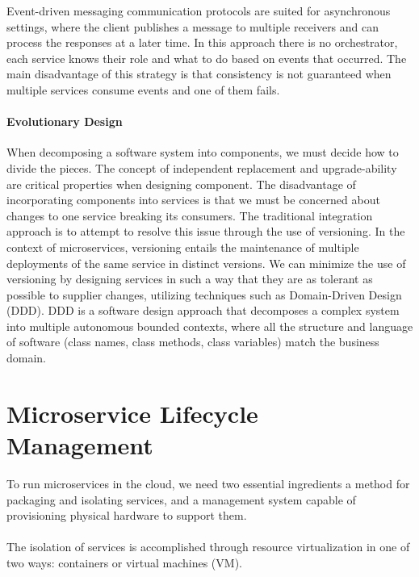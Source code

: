 Event-driven messaging communication protocols are suited for asynchronous settings,
where the client publishes a message to multiple receivers and can process the responses at a later time.
In this approach there is no orchestrator, each service knows their role and what to do based on events that occurred.
The main disadvantage of this strategy is that consistency is not guaranteed when multiple services consume events and one of them fails.

\paragraph{Evolutionary Design}
When decomposing a software system into components, we must decide how to divide the pieces.
The concept of independent replacement and upgrade-ability are critical properties when designing component.
The disadvantage of incorporating components into services is that we must be concerned about changes to one service breaking its consumers.
The traditional integration approach is to attempt to resolve this issue through the use of versioning.
In the context of microservices, versioning entails the maintenance of multiple deployments of the same service in distinct versions.
We can minimize the use of versioning by designing services in such a way that they are as tolerant as possible to supplier changes,
utilizing techniques such as Domain-Driven Design (DDD).
DDD is a software design approach that decomposes a complex system into multiple autonomous bounded contexts,
where all the structure and language of software (class names, class methods, class variables) match the business domain.

\section{Microservice Lifecycle Management} %
\label{sec:microservice_lifecycle_management}

To run microservices in the cloud, we need two essential ingredients a method for packaging and isolating services,
and a management system capable of provisioning physical hardware to support them.

\paragraph{}

The isolation of services is accomplished through resource virtualization in one of two ways: containers or virtual machines (VM).

